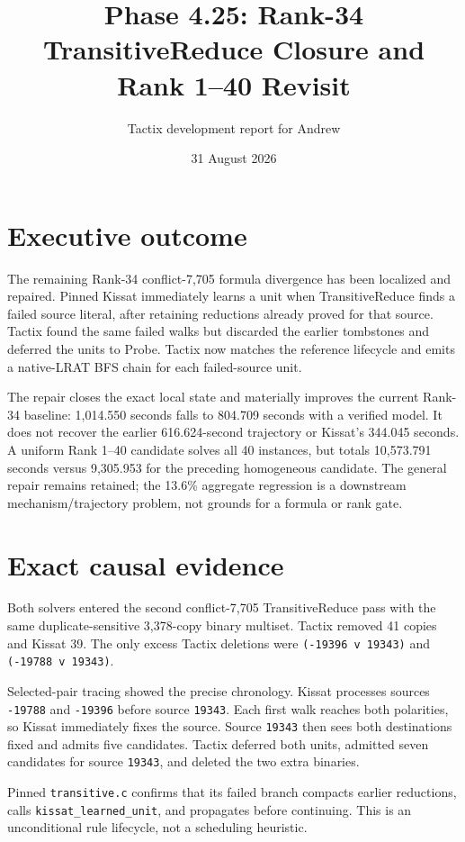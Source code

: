 \documentclass[11pt]{article}
\title{Phase 4.25: Rank-34 TransitiveReduce Closure and Rank 1--40 Revisit}
\author{Tactix development report for Andrew}
\date{31 August 2026}
\newcommand{\code}[1]{\texttt{#1}}
\begin{document}
\maketitle

\section{Executive outcome}

The remaining Rank-34 conflict-7,705 formula divergence has been localized and
repaired.  Pinned Kissat immediately learns a unit when TransitiveReduce finds
a failed source literal, after retaining reductions already proved for that
source.  Tactix found the same failed walks but discarded the earlier
tombstones and deferred the units to Probe.  Tactix now matches the reference
lifecycle and emits a native-LRAT BFS chain for each failed-source unit.

The repair closes the exact local state and materially improves the current
Rank-34 baseline: 1,014.550 seconds falls to 804.709 seconds with a verified
model.  It does not recover the earlier 616.624-second trajectory or Kissat's
344.045 seconds.  A uniform Rank 1--40 candidate solves all 40 instances, but
totals 10,573.791 seconds versus 9,305.953 for the preceding homogeneous
candidate.  The general repair remains retained; the 13.6\% aggregate
regression is a downstream mechanism/trajectory problem, not grounds for a
formula or rank gate.

\section{Exact causal evidence}

Both solvers entered the second conflict-7,705 TransitiveReduce pass with the
same duplicate-sensitive 3,378-copy binary multiset.  Tactix removed 41 copies
and Kissat 39.  The only excess Tactix deletions were
\code{(-19396 v 19343)} and \code{(-19788 v 19343)}.

Selected-pair tracing showed the precise chronology.  Kissat processes sources
\code{-19788} and \code{-19396} before source \code{19343}.  Each first walk
reaches both polarities, so Kissat immediately fixes the source.  Source
\code{19343} then sees both destinations fixed and admits five candidates.
Tactix deferred both units, admitted seven candidates for source \code{19343},
and deleted the two extra binaries.

Pinned \code{transitive.c} confirms that its failed branch compacts earlier
reductions, calls \code{kissat\_learned\_unit}, and propagates before continuing.
This is an unconditional rule lifecycle, not a scheduling heuristic.
\end{document}
